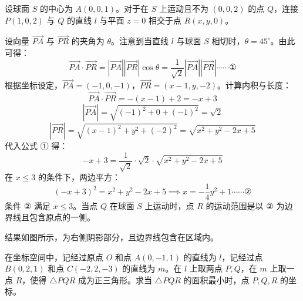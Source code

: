 \begin{questions}
\begin{solution}
设球面 $S$ 的中心为 $A(0, 0, 1)$。对于在 $S$ 上运动且不为 $(0, 0, 2)$ 的点 $Q$，连接 $P(1, 0, 2)$ 与 $Q$ 的直线 $l$ 与平面 $z = 0$ 相交于点 $R(x, y, 0)$。

设向量 $\vec{PA}$ 与 $\vec{PR}$ 的夹角为 $\theta$。注意到当直线 $l$ 与球面 $S$ 相切时，$\theta = 45^\circ$。由此可得：
\[
\vec{PA} \cdot \vec{PR} = |\vec{PA}| |\vec{PR}| \cos \theta = \frac{1}{\sqrt{2}} |\vec{PA}| |\vec{PR}| \cdots \cdots ①
\]
根据坐标设定，$\vec{PA} = (-1, 0, -1)$，$\vec{PR} = (x - 1, y, -2)$。计算内积与长度：
\[
\vec{PA} \cdot \vec{PR} = -(x - 1) + 2 = -x + 3
\]
\[
|\vec{PA}| = \sqrt{(-1)^2 + 0 + (-1)^2} = \sqrt{2}
\]
\[
|\vec{PR}| = \sqrt{(x - 1)^2 + y^2 + (-2)^2} = \sqrt{x^2 + y^2 - 2x + 5}
\]
代入公式 ① 得：
\[
-x + 3 = \frac{1}{\sqrt{2}} \cdot \sqrt{2} \cdot \sqrt{x^2 + y^2 - 2x + 5}
\]
在 $x \le 3$ 的条件下，两边平方：
\[
(-x + 3)^2 = x^2 + y^2 - 2x + 5 \implies x = -\frac{1}{4} y^2 + 1 \cdots \cdots ②
\]
条件 $②$ 满足 $x \le 3$。当点 $Q$ 在球面 $S$ 上运动时，点 $R$ 的运动范围是以 $②$ 为边界线且包含原点的一侧。

结果如图所示，为右侧阴影部分，且边界线包含在区域内。

\end{solution}

\question
在坐标空间中，记经过原点 $O$ 和点 $A(0, -1, 1)$ 的直线为 $l$，记经过点 $B(0, 2, 1)$ 和点 $C(-2, 2, -3)$ 的直线为 $m$。在 $l$ 上取两点 $P, Q$，在 $m$ 上取一点 $R$，使得 $\triangle PQR$ 成为正三角形。求当 $\triangle PQR$ 的面积最小时，点 $P, Q, R$ 的坐标。


\end{questions}
